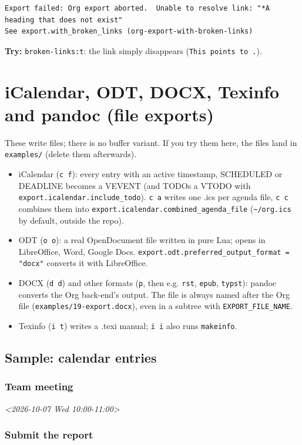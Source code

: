 \begin{verbatim}
Export failed: Org export aborted.  Unable to resolve link: "*A heading that does not exist"
See export.with_broken_links (org-export-with-broken-links)
\end{verbatim}

\textbf{Try:} \texttt{broken-links:t}: the link simply disappears (\texttt{This points to .}).
\section{iCalendar, ODT, DOCX, Texinfo and pandoc (file exports)}
\label{sec:org2989ed1}
These write files; there is no buffer variant. If you try them here, the
files land in \texttt{examples/} (delete them afterwards).

\begin{itemize}
\item iCalendar (\texttt{c f}): every entry with an active timestamp, SCHEDULED or
DEADLINE becomes a VEVENT (and TODOs a VTODO with
\texttt{export.icalendar.include\_todo}). \texttt{c a} writes one .ics per agenda file,
\texttt{c c} combines them into \texttt{export.icalendar.combined\_agenda\_file}
(\texttt{\textasciitilde{}/org.ics} by default, outside the repo).
\item ODT (\texttt{o o}): a real OpenDocument file written in pure Lua; opens in
LibreOffice, Word, Google Docs. \texttt{export.odt.preferred\_output\_format =
  "docx"} converts it with LibreOffice.
\item DOCX (\texttt{d d}) and other formats (\texttt{p}, then e.g. \texttt{rst}, \texttt{epub}, \texttt{typst}):
pandoc converts the Org back-end's output. The file is always named
after the Org file (\texttt{examples/19-export.docx}), even in a subtree with
\texttt{EXPORT\_FILE\_NAME}.
\item Texinfo (\texttt{i t}) writes a .texi manual; \texttt{i i} also runs \texttt{makeinfo}.
\end{itemize}
\subsection{Sample: calendar entries}
\label{sec:orga453975}
\subsubsection{Team meeting}
\label{sec:orgab4119f}
\textit{<2026-10-07 Wed 10:00-11:00>}
\subsubsection{Submit the report}
\label{sec:orgfca1736}

